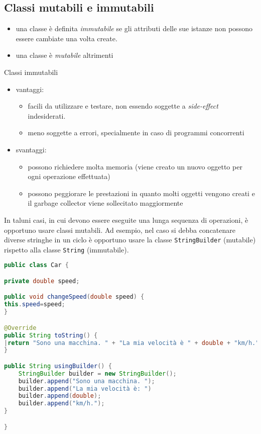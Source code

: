 \documentclass{article}
\begin{document}
\subsection{Classi mutabili e immutabili}
\begin{itemize}
\item una classe è definita \emph{immutabile} se gli attributi delle sue istanze non possono essere cambiate una volta create.
\item una classe è \emph{mutabile} altrimenti
\end{itemize}

Classi immutabili
\begin{itemize}
\item vantaggi:
\begin{itemize}
\item facili da utilizzare e testare, non essendo soggette a \emph{side-effect} indesiderati.
\item meno soggette a errori, specialmente in caso di programmi concorrenti
\end{itemize}
\item svantaggi:
\begin{itemize}
\item possono richiedere molta memoria (viene creato un nuovo oggetto per ogni operazione effettuata)
\item possono peggiorare le prestazioni in quanto molti oggetti vengono creati e il garbage collector viene sollecitato maggiormente
\end{itemize}
\end{itemize}

In taluni casi, in cui devono essere eseguite una lunga sequenza di operazioni, è opportuno usare classi mutabili.
Ad esempio, nel caso si debba concatenare diverse stringhe in un ciclo è opportuno usare la classe
\texttt{StringBuilder} (mutabile) rispetto alla classe \texttt{String} (immutabile).

\begin{lstlisting}[language=Java,escapechar=|]
public class Car {

private double speed;

public void changeSpeed(double speed) {
this.speed=speed;   
}

@Override
public String toString() {
|return "Sono una macchina. " + "La mia velocità è " + double + "km/h.";|
}

public String usingBuilder() {
	StringBuilder builder = new StringBuilder();
	builder.append("Sono una macchina. ");
    builder.append("La mia velocità è: ")
	builder.append(double);
	builder.append("km/h.");
}

}
\end{lstlisting}
\end{document}
